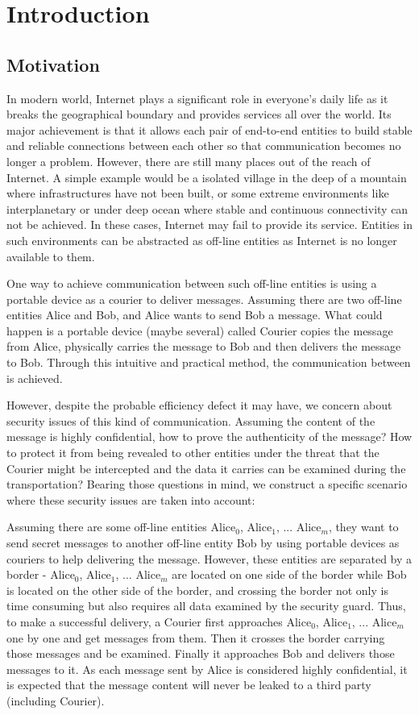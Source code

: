 \chapter{Introduction}
\section{Motivation}
In modern world, Internet plays a significant role in everyone's daily life as it breaks the geographical boundary and provides services all over the world. Its major achievement is that it allows each pair of end-to-end entities to build stable and reliable connections between each other so that communication becomes no longer a problem. However, there are still many places out of the reach of Internet. A simple example would be a isolated village in the deep of a mountain where infrastructures have not been built, or some extreme environments like interplanetary or under deep ocean where stable and continuous connectivity can not be achieved. In these cases, Internet may fail to provide its service. Entities in such environments can be abstracted as off-line entities as Internet is no longer available to them.

One way to achieve communication between such off-line entities is using a portable device as a courier to deliver messages. Assuming there are two off-line entities Alice and Bob, and Alice wants to send Bob a message. What could happen is a portable device (maybe several) called Courier copies the message from Alice, physically carries the message to Bob and then delivers the message to Bob. Through this intuitive and practical method, the communication between is achieved.

However, despite the probable efficiency defect it may have, we concern about security issues of this kind of communication. Assuming the content of the message is highly confidential, how to prove the authenticity of the message? How to protect it from being revealed to other entities under the threat that the Courier might be intercepted and the data it carries can be examined during the transportation? Bearing those questions in mind, we construct a specific scenario where these security issues are taken into account:

Assuming there are some off-line entities Alice$_0$, Alice$_1$, ... Alice$_m$, they want to send secret messages to another off-line entity Bob by using portable devices as couriers to help delivering the message. However, these entities are separated by a border - Alice$_0$, Alice$_1$, ... Alice$_m$ are located on one side of the border while Bob is located on the other side of the border, and crossing the border not only is time consuming but also requires all data examined by the security guard. Thus, to make a successful delivery, a Courier first approaches Alice$_0$, Alice$_1$, ... Alice$_m$ one by one and get messages from them. Then it crosses the border carrying those messages and be examined. Finally it approaches Bob and delivers those messages to it. As each message sent by Alice is considered highly confidential, it is expected that the message content will never be leaked to a third party (including Courier).

